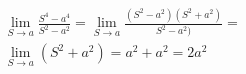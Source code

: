 \begin{ex}
\begin{align}
&\lim_{S\rightarrow a} \frac{S^4-a^4}{S^2-a^2}=\lim_{S\rightarrow a} \frac{(S^2-a^2)(S^2+a^2)}{S^2-a^2)}=\nonumber\\
&\lim_{S\rightarrow a} (S^2+a^2) = a^2+a^2=2a^2\nonumber
\end{align}
\end{ex}